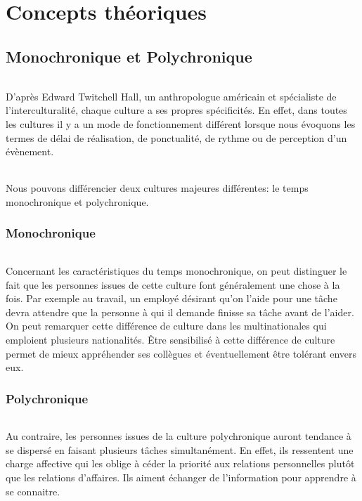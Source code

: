 \part{Concepts théoriques}

\chapter[Monochr. et Polychr.]{Monochronique et Polychronique}

\paragraph{} D'après Edward Twitchell Hall, un anthropologue américain et
spécialiste de l'interculturalité, chaque culture a ses propres spécificités.
En effet, dans toutes les cultures il y a un mode de fonctionnement différent
lorsque nous évoquons les termes de délai de réalisation, de ponctualité, de
rythme ou de perception d'un évènement.

\paragraph{} Nous pouvons différencier deux cultures majeures différentes: le
temps monochronique et polychronique.

\section{Monochronique}

\paragraph{} Concernant les caractéristiques du temps monochronique, on peut
distinguer le fait que les personnes issues de cette culture font généralement
une chose à la fois. Par exemple au travail, un employé désirant qu'on l'aide
pour une tâche devra attendre que la personne à qui il demande finisse sa tâche
avant de l'aider. On peut remarquer cette différence de culture dans les
multinationales qui emploient plusieurs nationalités. Être sensibilisé à cette
différence de culture permet de mieux appréhender ses collègues et
éventuellement être tolérant envers eux.

\section{Polychronique}

\paragraph{} Au contraire, les personnes issues de la culture polychronique
auront tendance à se dispersé en faisant plusieurs tâches simultanément. En
effet, ils ressentent une charge affective qui les oblige à céder la priorité
aux relations personnelles plutôt que les relations d'affaires. Ils aiment
échanger de l'information pour apprendre à se connaitre.

